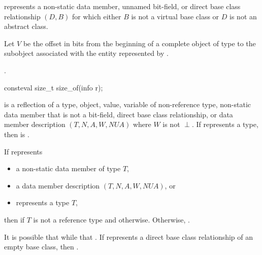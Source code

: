 \begin{itemdescr}
\pnum
\constantwhen
{} represents a non-static data member,
unnamed bit-field, or
direct base class relationship $(D, B)$
for which either $B$ is not a virtual base class
or $D$ is not an abstract class.

\pnum
Let $V$ be the offset in bits from the beginning of a complete object
of type 
to the subobject associated with the entity represented by .

\pnum
\returns
{}.
\end{itemdescr}

%
\begin{itemdecl}
consteval size_t size_of(info r);
\end{itemdecl}

\begin{itemdescr}
\pnum
\constantwhen
{} is a reflection of a
type,
object,
value,
variable of non-reference type,
non-static data member that is not a bit-field,
direct base class relationship, or
data member description $(T, N, A, W, \mathit{NUA})$
where $W$ is not $\perp$.
If  represents a type,
then  is .

\pnum
\returns
If  represents
\begin{itemize}
\item a non-static data member of type $T$,
\item a data member description $(T, N, A, W, \mathit{NUA})$, or
\item {} represents a type $T$,
\end{itemize}
then  if $T$ is not a reference type
and  otherwise.
Otherwise, .
\begin{note}
It is possible that while 
that .
If  represents a direct base class relationship of an empty base class,
then .
\end{note}
\end{itemdescr}

